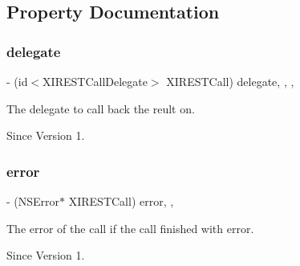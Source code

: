 \subsection{Property Documentation}
\hypertarget{protocol_x_i_r_e_s_t_call_01-p_a5a8ef8749c07d609e217012db1c5051e}{}\label{protocol_x_i_r_e_s_t_call_01-p_a5a8ef8749c07d609e217012db1c5051e} 
\subsubsection{\texorpdfstring{delegate}{delegate}}
{\footnotesize\ttfamily -\/ (id$<$X\+I\+R\+E\+S\+T\+Call\+Delegate$>$ X\+I\+R\+E\+S\+T\+Call) delegate\hspace{0.3cm}{\ttfamily [read]}, {\ttfamily [write]}, {\ttfamily [nonatomic]}, {\ttfamily [weak]}}



The delegate to call back the reult on. 

\begin{DoxySince}{Since}
Version 1. 
\end{DoxySince}
\hypertarget{protocol_x_i_r_e_s_t_call_01-p_af71a4319828a2e994a3e2360002f49d9}{}\label{protocol_x_i_r_e_s_t_call_01-p_af71a4319828a2e994a3e2360002f49d9} 
\subsubsection{\texorpdfstring{error}{error}}
{\footnotesize\ttfamily -\/ (N\+S\+Error$\ast$ X\+I\+R\+E\+S\+T\+Call) error\hspace{0.3cm}{\ttfamily [read]}, {\ttfamily [nonatomic]}, {\ttfamily [assign]}}



The error of the call if the call finished with error. 

\begin{DoxySince}{Since}
Version 1. 
\end{DoxySince}
\hypertarget{protocol_x_i_r_e_s_t_call_01-p_a860f6b923f9cd9eb626e854e4f508df1}{}\label{protocol_x_i_r_e_s_t_call_01-p_a860f6b923f9cd9eb626e854e4f508df1} 
